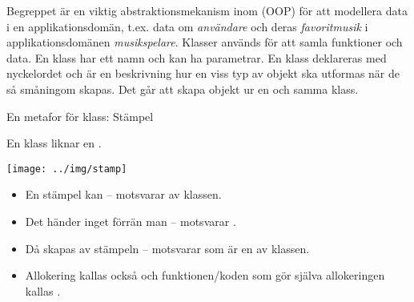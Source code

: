 



\ifkompendium
Begreppet  är en viktig abstraktionsmekanism inom  (OOP) för att modellera data i en applikationsdomän, t.ex. data om \emph{användare} och deras \emph{favoritmusik} i applikationsdomänen \emph{musikspelare}. Klasser används för att samla funktioner och data. En klass har ett namn och kan ha parametrar. En klass deklareras med nyckelordet  och är en beskrivning hur en viss typ av objekt ska utformas när de så småningom skapas. Det går att skapa  objekt ur en och samma klass. 
\fi


\begin{Slide}{En metafor för klass: Stämpel}\SlideFontSmall
\begin{multicols}{2}

En klass liknar en .

\vspace{1em}\texttt{[image: ../img/stamp]}

\columnbreak

\pause

\begin{itemize}
\item En stämpel kan  -- motsvarar  av klassen.
 \item Det händer inget förrän man  -- motsvarar .
\item Då skapas  av stämpeln -- motsvarar  som är en  av klassen.
\item Allokering kallas också  och funktionen/koden som gör själva allokeringen kallas .
\end{itemize}

\end{multicols}
\end{Slide}




